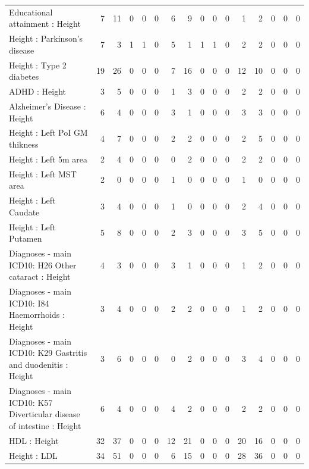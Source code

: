 \begin{table}[ht]
\begin{tabular}{lrrrrrrrrrrrrrrr}
  Educational attainment : Height  &   7 &  11 &   0 &   0 &   0 &   6 &   9 &   0 &   0 &   0 &   1 &   2 &   0 &   0 &   0 \\ 
  Height  : Parkinson's disease &   7 &   3 &   1 &   1 &   0 &   5 &   1 &   1 &   1 &   0 &   2 &   2 &   0 &   0 &   0 \\ 
  Height  : Type 2 diabetes &  19 &  26 &   0 &   0 &   0 &   7 &  16 &   0 &   0 &   0 &  12 &  10 &   0 &   0 &   0 \\ 
  ADHD : Height  &   3 &   5 &   0 &   0 &   0 &   1 &   3 &   0 &   0 &   0 &   2 &   2 &   0 &   0 &   0 \\ 
  Alzheimer's Disease : Height  &   6 &   4 &   0 &   0 &   0 &   3 &   1 &   0 &   0 &   0 &   3 &   3 &   0 &   0 &   0 \\ 
  Height  : Left PoI GM thikness &   4 &   7 &   0 &   0 &   0 &   2 &   2 &   0 &   0 &   0 &   2 &   5 &   0 &   0 &   0 \\ 
  Height  : Left 5m area &   2 &   4 &   0 &   0 &   0 &   0 &   2 &   0 &   0 &   0 &   2 &   2 &   0 &   0 &   0 \\ 
  Height  : Left MST area &   2 &   0 &   0 &   0 &   0 &   1 &   0 &   0 &   0 &   0 &   1 &   0 &   0 &   0 &   0 \\ 
  Height  : Left Caudate &   3 &   4 &   0 &   0 &   0 &   1 &   0 &   0 &   0 &   0 &   2 &   4 &   0 &   0 &   0 \\ 
  Height  : Left Putamen &   5 &   8 &   0 &   0 &   0 &   2 &   3 &   0 &   0 &   0 &   3 &   5 &   0 &   0 &   0 \\ 
  Diagnoses - main ICD10: H26 Other cataract : Height  &   4 &   3 &   0 &   0 &   0 &   3 &   1 &   0 &   0 &   0 &   1 &   2 &   0 &   0 &   0 \\ 
  Diagnoses - main ICD10: I84 Haemorrhoids : Height  &   3 &   4 &   0 &   0 &   0 &   2 &   2 &   0 &   0 &   0 &   1 &   2 &   0 &   0 &   0 \\ 
  Diagnoses - main ICD10: K29 Gastritis and duodenitis : Height  &   3 &   6 &   0 &   0 &   0 &   0 &   2 &   0 &   0 &   0 &   3 &   4 &   0 &   0 &   0 \\ 
  Diagnoses - main ICD10: K57 Diverticular disease of intestine : Height  &   6 &   4 &   0 &   0 &   0 &   4 &   2 &   0 &   0 &   0 &   2 &   2 &   0 &   0 &   0 \\ 
  HDL : Height  &  32 &  37 &   0 &   0 &   0 &  12 &  21 &   0 &   0 &   0 &  20 &  16 &   0 &   0 &   0 \\ 
  Height  : LDL &  34 &  51 &   0 &   0 &   0 &   6 &  15 &   0 &   0 &   0 &  28 &  36 &   0 &   0 &   0 \\ 

\end{tabular}
\end{table}
